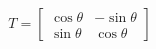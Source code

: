 \documentclass[preview]{standalone}
\begin{document}
\begin{align*}
T = \begin{bmatrix} \cos \theta & -\sin \theta \\ \sin \theta & \cos \theta \end{bmatrix}
\end{align*}
\end{document}

